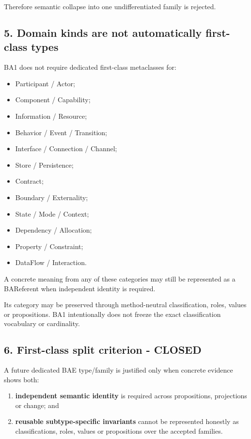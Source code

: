 \documentclass[
  10pt,
  a4paper,
]{article}
\providecommand{\tightlist}{%
  \setlength{\itemsep}{0pt}\setlength{\parskip}{0pt}}
\begin{document}
Therefore semantic collapse into one undifferentiated family is
rejected.

\subsection{5. Domain kinds are not automatically first-class
types}\label{domain-kinds-are-not-automatically-first-class-types}

BA1 does not require dedicated first-class metaclasses for:

\begin{itemize}
\tightlist
\item
  Participant / Actor;
\item
  Component / Capability;
\item
  Information / Resource;
\item
  Behavior / Event / Transition;
\item
  Interface / Connection / Channel;
\item
  Store / Persistence;
\item
  Contract;
\item
  Boundary / Externality;
\item
  State / Mode / Context;
\item
  Dependency / Allocation;
\item
  Property / Constraint;
\item
  DataFlow / Interaction.
\end{itemize}

A concrete meaning from any of these categories may still be represented
as a BAReferent when independent identity is required.

Its category may be preserved through method-neutral classification,
roles, values or propositions. BA1 intentionally does not freeze the
exact classification vocabulary or cardinality.

\subsection{6. First-class split criterion -
CLOSED}\label{first-class-split-criterion---closed}

A future dedicated BAE type/family is justified only when concrete
evidence shows both:

\begin{enumerate}
\def\labelenumi{\arabic{enumi}.}
\tightlist
\item
  \textbf{independent semantic identity} is required across
  propositions, projections or change; and
\item
  \textbf{reusable subtype-specific invariants} cannot be represented
  honestly as classifications, roles, values or propositions over the
  accepted families.
\end{enumerate}
\end{document}
